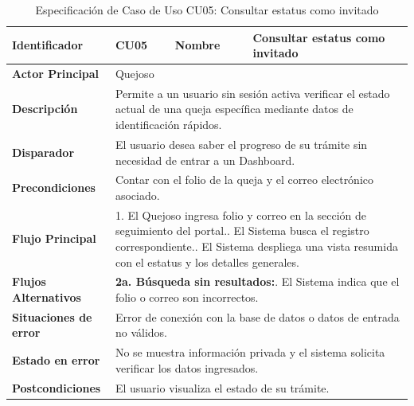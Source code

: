\vspace{0.8cm}

\begingroup
\setlength{\parskip}{0pt}
\begin{longtable}{|p{3.5cm}|p{2cm}|p{2.5cm}|p{7cm}|}
\caption{Especificación de Caso de Uso CU05: Consultar estatus como invitado}
\label{tab:cu05_consultar_estatus} \\
\hline
\textbf{Identificador} & CU05 & \textbf{Nombre} & Consultar estatus como invitado \\ \hline
\textbf{Actor Principal} & \multicolumn{3}{p{11.5cm}|}{Quejoso} \\ \hline
\textbf{Descripción} & \multicolumn{3}{p{11.5cm}|}{Permite a un usuario sin sesión activa verificar el estado actual de una queja específica mediante datos de identificación rápidos.} \\ \hline
\textbf{Disparador} & \multicolumn{3}{p{11.5cm}|}{El usuario desea saber el progreso de su trámite sin necesidad de entrar a un Dashboard.} \\ \hline
\textbf{Precondiciones} & \multicolumn{3}{p{11.5cm}|}{Contar con el folio de la queja y el correo electrónico asociado.} \\ \hline
\textbf{Flujo Principal} & \multicolumn{3}{p{11.5cm}|}{1. El Quejoso ingresa folio y correo en la sección de seguimiento del portal.\newline 2. El Sistema busca el registro correspondiente.\newline 3. El Sistema despliega una vista resumida con el estatus y los detalles generales.} \\ \hline
\textbf{Flujos Alternativos} & \multicolumn{3}{p{11.5cm}|}{\textbf{2a. Búsqueda sin resultados:}\newline 1. El Sistema indica que el folio o correo son incorrectos.} \\ \hline
\textbf{Situaciones de error} & \multicolumn{3}{p{11.5cm}|}{Error de conexión con la base de datos o datos de entrada no válidos.} \\ \hline
\textbf{Estado en error} & \multicolumn{3}{p{11.5cm}|}{No se muestra información privada y el sistema solicita verificar los datos ingresados.} \\ \hline
\textbf{Postcondiciones} & \multicolumn{3}{p{11.5cm}|}{El usuario visualiza el estado de su trámite.} \\ \hline
\end{longtable}
\endgroup

\vspace{0.8cm}

